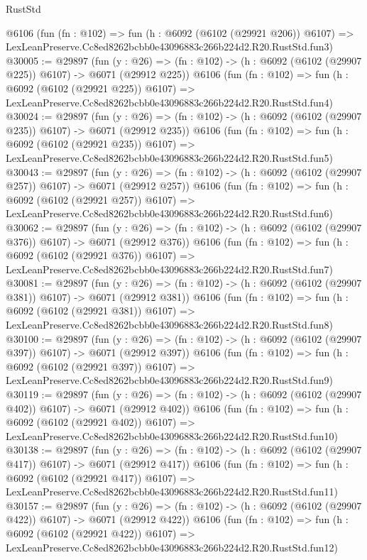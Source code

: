 \begin{lexlean}{RustStd}
\begin{coremodule}
    @6106
    (fun (fn : @102) =>
    fun (h : @6092 (@6102 (@29921 @206)) @6107) =>
    LexLeanPreserve.Cc8ed8262bcbb0e43096883c266b224d2.R20.RustStd.fun3)
@30005 := @29897
    (fun (y : @26) => (fn : @102) -> (h : @6092 (@6102 (@29907 @225)) @6107) -> @6071 (@29912 @225))
    @6106
    (fun (fn : @102) =>
    fun (h : @6092 (@6102 (@29921 @225)) @6107) =>
    LexLeanPreserve.Cc8ed8262bcbb0e43096883c266b224d2.R20.RustStd.fun4)
@30024 := @29897
    (fun (y : @26) => (fn : @102) -> (h : @6092 (@6102 (@29907 @235)) @6107) -> @6071 (@29912 @235))
    @6106
    (fun (fn : @102) =>
    fun (h : @6092 (@6102 (@29921 @235)) @6107) =>
    LexLeanPreserve.Cc8ed8262bcbb0e43096883c266b224d2.R20.RustStd.fun5)
@30043 := @29897
    (fun (y : @26) => (fn : @102) -> (h : @6092 (@6102 (@29907 @257)) @6107) -> @6071 (@29912 @257))
    @6106
    (fun (fn : @102) =>
    fun (h : @6092 (@6102 (@29921 @257)) @6107) =>
    LexLeanPreserve.Cc8ed8262bcbb0e43096883c266b224d2.R20.RustStd.fun6)
@30062 := @29897
    (fun (y : @26) => (fn : @102) -> (h : @6092 (@6102 (@29907 @376)) @6107) -> @6071 (@29912 @376))
    @6106
    (fun (fn : @102) =>
    fun (h : @6092 (@6102 (@29921 @376)) @6107) =>
    LexLeanPreserve.Cc8ed8262bcbb0e43096883c266b224d2.R20.RustStd.fun7)
@30081 := @29897
    (fun (y : @26) => (fn : @102) -> (h : @6092 (@6102 (@29907 @381)) @6107) -> @6071 (@29912 @381))
    @6106
    (fun (fn : @102) =>
    fun (h : @6092 (@6102 (@29921 @381)) @6107) =>
    LexLeanPreserve.Cc8ed8262bcbb0e43096883c266b224d2.R20.RustStd.fun8)
@30100 := @29897
    (fun (y : @26) => (fn : @102) -> (h : @6092 (@6102 (@29907 @397)) @6107) -> @6071 (@29912 @397))
    @6106
    (fun (fn : @102) =>
    fun (h : @6092 (@6102 (@29921 @397)) @6107) =>
    LexLeanPreserve.Cc8ed8262bcbb0e43096883c266b224d2.R20.RustStd.fun9)
@30119 := @29897
    (fun (y : @26) => (fn : @102) -> (h : @6092 (@6102 (@29907 @402)) @6107) -> @6071 (@29912 @402))
    @6106
    (fun (fn : @102) =>
    fun (h : @6092 (@6102 (@29921 @402)) @6107) =>
    LexLeanPreserve.Cc8ed8262bcbb0e43096883c266b224d2.R20.RustStd.fun10)
@30138 := @29897
    (fun (y : @26) => (fn : @102) -> (h : @6092 (@6102 (@29907 @417)) @6107) -> @6071 (@29912 @417))
    @6106
    (fun (fn : @102) =>
    fun (h : @6092 (@6102 (@29921 @417)) @6107) =>
    LexLeanPreserve.Cc8ed8262bcbb0e43096883c266b224d2.R20.RustStd.fun11)
@30157 := @29897
    (fun (y : @26) => (fn : @102) -> (h : @6092 (@6102 (@29907 @422)) @6107) -> @6071 (@29912 @422))
    @6106
    (fun (fn : @102) =>
    fun (h : @6092 (@6102 (@29921 @422)) @6107) =>
    LexLeanPreserve.Cc8ed8262bcbb0e43096883c266b224d2.R20.RustStd.fun12)

\end{coremodule}
\end{lexlean}
